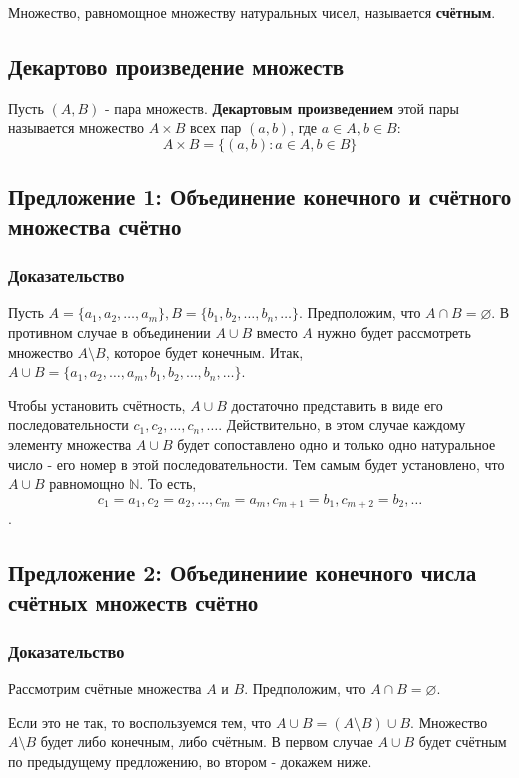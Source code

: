 \documentclass{article}
\begin{document}
Множество, равномощное множеству натуральных чисел, называется \textbf{счётным}.

\subsection{Декартово произведение множеств}

Пусть $(A, B)$ - пара множеств. \textbf{Декартовым произведением} этой пары называется множество $A \times B$ всех пар $(a, b)$, где $a \in A, b \in B$: \[
	A \times B = \{(a, b):a \in A, b \in B\}
\]

\subsection{Предложение 1: Объединение конечного и счётного множества счётно}
\subsubsection*{Доказательство}
Пусть $A = \{a_1, a_2, \dots, a_m\}, B = \{b_1, b_2, \dots, b_n, \dots\}$. Предположим, что $A \cap B = \varnothing$. В противном случае в объединении $A \cup B$ вместо $A$ нужно будет рассмотреть множество $A \setminus B$, которое будет конечным. Итак, $A \cup B = \{a_1, a_2, \dots, a_m, b_1, b_2, \dots, b_n, \dots\}$.

Чтобы установить счётность, $A \cup B$ достаточно представить в виде его последовательности $c_1, c_2, \dots, c_n, \dots$. Действительно, в этом случае каждому элементу множества $A \cup B$ будет сопоставлено одно и только одно натуральное число - его номер в этой последовательности. Тем самым будет установлено, что $A \cup B$ равномощно $\mathbb{N}$. То есть, \[c_1 = a_1, c_2 = a_2, \dots, c_m = a_m, c_{m+1} = b_1, c_{m+2} = b_2, \dots\].


\subsection{Предложение 2: Объединениие конечного числа счётных множеств счётно}
\subsubsection*{Доказательство}

Рассмотрим счётные множества $A$ и $B$. Предположим, что $A \cap B = \varnothing$.

Если это не так, то воспользуемся тем, что $A \cup B = (A \setminus B) \cup B$. Множество $A \setminus B$ будет либо конечным, либо счётным. В первом случае $A \cup B$ будет счётным по предыдущему предложению, во втором - докажем ниже.
\end{document}

